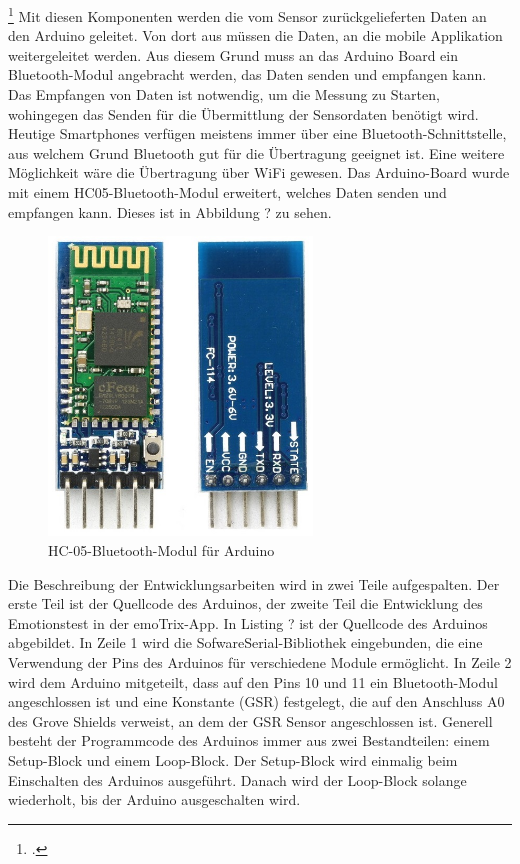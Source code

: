 \footcitetext[Bilder von:][]{Sou18, Rei18}
\newline \newline
Mit diesen Komponenten werden die vom Sensor zurückgelieferten Daten an den Arduino geleitet. Von dort aus müssen die Daten, an die mobile Applikation weitergeleitet werden. Aus diesem Grund muss an das Arduino Board ein Bluetooth-Modul angebracht werden, das Daten senden und empfangen kann. Das Empfangen von Daten ist notwendig, um die Messung zu Starten, wohingegen das Senden für die Übermittlung der Sensordaten benötigt wird. Heutige Smartphones verfügen meistens immer über eine Bluetooth-Schnittstelle, aus welchem Grund Bluetooth gut für die Übertragung geeignet ist. Eine weitere Möglichkeit wäre die Übertragung über WiFi gewesen. Das Arduino-Board wurde mit einem HC05-Bluetooth-Modul erweitert, welches Daten senden und empfangen kann. Dieses ist in Abbildung ? zu sehen.
\begin{figure}[h]
	\centering
	\includegraphics[width=7cm]{Bilder/hc05.jpg}
	\caption[HC-05-Bluetooth-Modul für Arduino]{HC-05-Bluetooth-Modul für Arduino\footnotemark}
\end{figure}%
\newline
Die Beschreibung der Entwicklungsarbeiten wird in zwei Teile aufgespalten. Der erste Teil ist der Quellcode des Arduinos, der zweite Teil die Entwicklung des Emotionstest in der emoTrix-App. \newline
In Listing ? ist der Quellcode des Arduinos abgebildet. In Zeile 1 wird die SofwareSerial-Bibliothek eingebunden, die eine Verwendung der Pins des Arduinos für verschiedene Module ermöglicht. In Zeile 2 wird dem Arduino mitgeteilt, dass auf den Pins 10 und 11 ein Bluetooth-Modul angeschlossen ist und eine Konstante (GSR) festgelegt, die auf den Anschluss A0 des Grove Shields verweist, an dem der GSR Sensor angeschlossen ist. \newline
Generell besteht der Programmcode des Arduinos immer aus zwei Bestandteilen: einem Setup-Block und einem Loop-Block. Der Setup-Block wird einmalig beim Einschalten des Arduinos ausgeführt. Danach wird der Loop-Block solange wiederholt, bis der Arduino ausgeschalten wird. \newline \newline 

